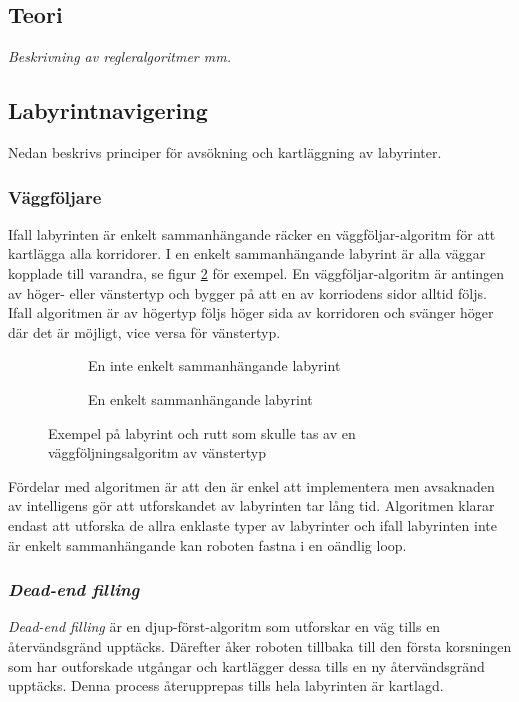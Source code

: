 \documentclass[11pt]{article}
\begin{document}
\begin{flushleft}
\pagebreak

\section{Teori}
\textit{Beskrivning av regleralgoritmer mm.}

\subsection{Labyrintnavigering}
Nedan beskrivs principer för avsökning och kartläggning av labyrinter.

\subsubsection{Väggföljare}
Ifall labyrinten är enkelt sammanhängande räcker en väggföljar-algoritm för att kartlägga alla korridorer. I en enkelt sammanhängande labyrint är alla väggar kopplade till varandra, se figur \ref{maze} för exempel. En väggföljar-algoritm är antingen av höger- eller vänstertyp och bygger på att en av korriodens sidor alltid följs. Ifall algoritmen är av högertyp följs höger sida av korridoren och svänger höger där det är möjligt, vice versa för vänstertyp.

\begin{figure}[htbp]
	\centering
	\begin{subfigure}{.5\linewidth}
		\centering
		\noindent\resizebox{.5\textwidth}{!}{
			}
		\caption{En inte enkelt sammanhängande labyrint}	
		\label{non-connected}
	\end{subfigure}%
	\begin{subfigure}{.5\linewidth}
		\centering
		\noindent\resizebox{.5\textwidth}{!}{
			}
		\caption{En enkelt sammanhängande labyrint}	
	\end{subfigure}%
	\caption{Exempel på labyrint och rutt som skulle tas av en väggföljningsalgoritm av vänstertyp}
	\label{maze}
\end{figure}%

Fördelar med algoritmen är att den är enkel att implementera men avsaknaden av intelligens gör att utforskandet av labyrinten tar lång tid. Algoritmen klarar endast att utforska de allra enklaste typer av labyrinter och ifall labyrinten inte är enkelt sammanhängande kan roboten fastna i en oändlig loop.

\subsubsection{\emph{Dead-end filling}}
\emph{Dead-end filling} är en djup-först-algoritm som utforskar en väg tills en återvändsgränd upptäcks. Därefter åker roboten tillbaka till den första korsningen som har outforskade utgångar och kartlägger dessa tills en ny återvändsgränd upptäcks. Denna process återupprepas tills hela labyrinten är kartlagd.


\end{flushleft}
\end{document}
